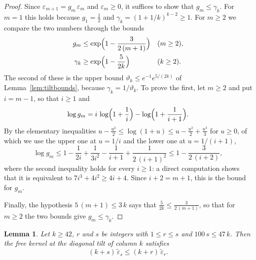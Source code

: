 \documentclass{amsart}
\newtheorem{lemma}[theorem]{Lemma}
\theoremstyle{definition}
\theoremstyle{remark}
\numberwithin{equation}{section}
\begin{document}
\begin{proof}
Since $\varepsilon_{m+1}=g_m\,\varepsilon_m$ and $\varepsilon_m\ge 0$, it suffices to show that $g_m\le\gamma_k$. For $m=1$ this holds because $g_1=\frac12$ and $\gamma_k=(1+1/k)^{k-2}\ge 1$. For $m\ge 2$ we compare the two numbers through the bounds
\begin{align}
g_m&\le\exp\Bigl(1-\frac{3}{2\,(m+1)}\Bigr)&&(m\ge 2),\label{eq:near-ratio}\\
\gamma_k&\ge\exp\Bigl(1-\frac{5}{2k}\Bigr)&&(k\ge 2).\label{eq:near-gamma}
\end{align}
The second of these is the upper bound $\vartheta_k\le e^{-1}e^{5/(2k)}$ of Lemma~\ref{lem:tiltbounds}, because $\gamma_k=1/\vartheta_k$. To prove the first, let $m\ge 2$ and put $i=m-1$, so that $i\ge 1$ and
\[
\log g_m=i\,\log\Bigl(1+\frac1i\Bigr)-\log\Bigl(1+\frac{1}{i+1}\Bigr).
\]
By the elementary inequalities $u-\frac{u^2}{2}\le\log(1+u)\le u-\frac{u^2}{2}+\frac{u^3}{3}$ for $u\ge 0$, of which we use the upper one at $u=1/i$ and the lower one at $u=1/(i+1)$,
\[
\log g_m\le 1-\frac{1}{2i}+\frac{1}{3i^2}-\frac{1}{i+1}+\frac{1}{2\,(i+1)^2}\le 1-\frac{3}{2\,(i+2)} ,
\]
where the second inequality holds for every $i\ge 1$: a direct computation shows that it is equivalent to $7i^3+4i^2\ge 4i+4$. Since $i+2=m+1$, this is the bound for $g_m$.

Finally, the hypothesis $5\,(m+1)\le 3\,k$ says that $\frac{5}{2k}\le\frac{3}{2\,(m+1)}$, so that for $m\ge 2$ the two bounds give $g_m\le\gamma_k$.
\end{proof}

\begin{lemma}\label{lem:tworowscondition}
Let $k\ge 42$, $r$ and $s$ be integers with $1\le r\le s$ and $100\,s\le 47\,k$. Then the free kernel at the diagonal tilt of column $k$ satisfies
\[
(k+s)\,\tilde\varepsilon_s\le(k+r)\,\tilde\varepsilon_r .
\]
\end{lemma}
\end{document}
